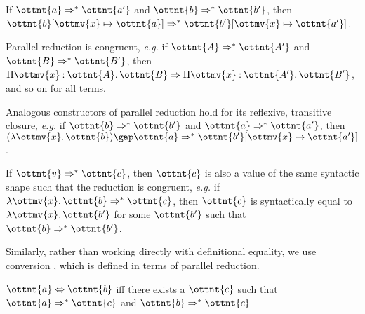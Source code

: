 \documentclass[a4paper,UKenglish,cleveref,autoref,thm-restate]{lipics-v2021}
\makeatletter
\newcommand{\eg}{\textit{e.g.}\@\xspace}
\makeatother
\begin{document}
\begin{lemma}[Substitution (p.r.)] \label{lem:pars:subst}
  If $ \ottnt{a}  \Rightarrow^\ast  \ottnt{a'} $ and $ \ottnt{b}  \Rightarrow^\ast  \ottnt{b'} $,
  then $  \ottnt{b} [  \ottmv{x}  \mapsto  \ottnt{a}  ]   \Rightarrow^\ast   \ottnt{b'} [  \ottmv{x}  \mapsto  \ottnt{a'}  ]  $.
\end{lemma}

\begin{lemma}[Congruence (p.r.)] \label{lem:pars:cong}
  Parallel reduction is congruent,
  \eg if $ \ottnt{A}  \Rightarrow^\ast  \ottnt{A'} $ and $ \ottnt{B}  \Rightarrow^\ast  \ottnt{B'} $,
  then $  \Pi  \ottmv{x}  \mathbin{:}  \ottnt{A}  \mathpunct{.}  \ottnt{B}   \Rightarrow   \Pi  \ottmv{x}  \mathbin{:}  \ottnt{A'}  \mathpunct{.}  \ottnt{B'}  $,
  and so on for all terms.
\end{lemma}

\begin{lemma}[Construction (p.r.)] \label{lem:pars:cons}
  Analogous constructors of parallel reduction hold
  for its reflexive, transitive closure,
  \eg if $ \ottnt{b}  \Rightarrow^\ast  \ottnt{b'} $ and $ \ottnt{a}  \Rightarrow^\ast  \ottnt{a'} $,
  then $   (  \lambda  \ottmv{x}  \mathpunct{.}  \ottnt{b}  )   \gap  \ottnt{a}   \Rightarrow^\ast   \ottnt{b'} [  \ottmv{x}  \mapsto  \ottnt{a'}  ]  $.
\end{lemma}

\begin{lemma}[Inversion (p.r.)] \label{lem:pars:inv}
  If $ \ottnt{v}  \Rightarrow^\ast  \ottnt{c} $, then $\ottnt{c}$ is also a value of the same syntactic shape
  such that the reduction is congruent,
  \eg if $  \lambda  \ottmv{x}  \mathpunct{.}  \ottnt{b}   \Rightarrow^\ast  \ottnt{c} $, then $\ottnt{c}$ is syntactically equal to $ \lambda  \ottmv{x}  \mathpunct{.}  \ottnt{b'} $
  for some $\ottnt{b'}$ such that $ \ottnt{b}  \Rightarrow^\ast  \ottnt{b'} $.
\end{lemma}

Similarly, rather than working directly with definitional equality,
we use conversion ,
which is defined in terms of parallel reduction.

\begin{definition}[Conversion]
  $ \ottnt{a}  \Leftrightarrow  \ottnt{b} $ iff there exists a $\ottnt{c}$ such that
  $ \ottnt{a}  \Rightarrow^\ast  \ottnt{c} $ and $ \ottnt{b}  \Rightarrow^\ast  \ottnt{c} $
\end{definition}
\end{document}
